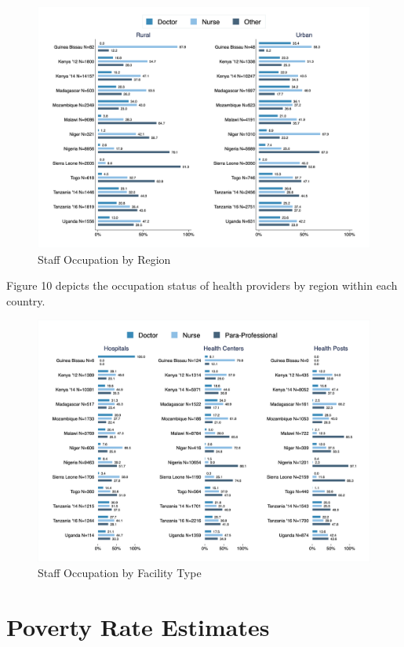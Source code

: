 \documentclass{article}                 %
\begin{document}
			\begin{figure}[H] 
				\centering
				\caption{Staff Occupation  by Region} 
				\includegraphics[width=\textwidth]{"../Output/Final/Staff_reg"}
			\end{figure}
		
	Figure 10 depicts the occupation status of health providers by region within each country.
		
			\begin{figure}[H] 
				\centering
				\caption{Staff Occupation  by Facility Type} 
				\includegraphics[width=\textwidth]{"../Output/Final/Staff_fl"}
			\end{figure}
			
	\section*{Poverty Rate Estimates}
	
\end{document}
